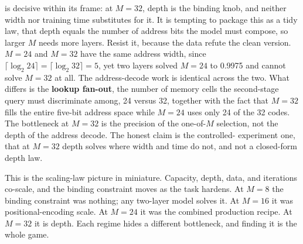  is decisive within its frame: at $M=32$, depth is
the binding knob, and neither width nor training time substitutes for it. It
is tempting to package this as a tidy law, that depth equals the number of
address bits the model must compose, so larger $M$ needs more layers. Resist
it, because the data refute the clean version. $M=24$ and $M=32$ have the same
address width, since $\lceil \log_2 24 \rceil = \lceil \log_2 32 \rceil = 5$,
yet two layers solved $M=24$ to 0.9975 and cannot solve $M=32$ at all. The
address-decode work is identical across the two. What differs is the
\textbf{lookup fan-out}, the number of memory cells the second-stage query
must discriminate among, 24 versus 32, together with the fact that $M=32$
fills the entire five-bit address space while $M=24$ uses only 24 of the 32
codes. The bottleneck at $M=32$ is the precision of the one-of-$M$ selection,
not the depth of the address decode. The honest claim is the controlled-
experiment one, that at $M=32$ depth solves where width and time do not, and
not a closed-form depth law.

This is the scaling-law picture in miniature. Capacity, depth, data, and
iterations co-scale, and the binding constraint moves as the task hardens. At
$M=8$ the binding constraint was nothing; any two-layer model solves it. At
$M=16$ it was positional-encoding scale. At $M=24$ it was the combined
production recipe. At $M=32$ it is depth. Each regime hides a different
bottleneck, and finding it is the whole game.
